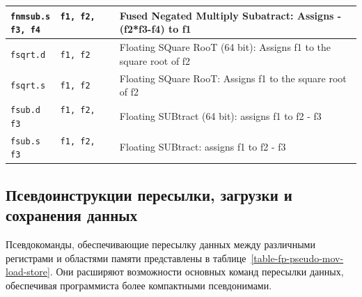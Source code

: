 \begin{table}[h]
\begin{tabularx}{\textwidth}{|l|X|}
        \hline \verb|fnmsub.s  f1, f2, f3, f4| & Fused Negated Multiply Subatract: Assigns -(f2*f3-f4) to f1 \\
        \hline \verb|fsqrt.d   f1, f2| & Floating SQuare RooT (64 bit): Assigns f1 to the square root of f2 \\
        \hline \verb|fsqrt.s   f1, f2| & Floating SQuare RooT: Assigns f1 to the square root of f2 \\
        \hline \verb|fsub.d    f1, f2, f3| & Floating SUBtract (64 bit): assigns f1 to f2 - f3 \\
        \hline \verb|fsub.s    f1, f2, f3| & Floating SUBtract: assigns f1 to f2 - f3 \\
        \hline
    \end{tabularx}
    \label{table-fp-pseudo-calc}
\end{table}

\subsection{Псевдоинструкции пересылки, загрузки и сохранения данных}

Псевдокоманды, обеспечивающие пересылку данных между различными регистрами и областями памяти представлены в таблице~\ref{table-fp-pseudo-mov-load-store}. Они расширяют возможности основных команд пересылки данных, обеспечивая программиста более компактными псевдонимами.

